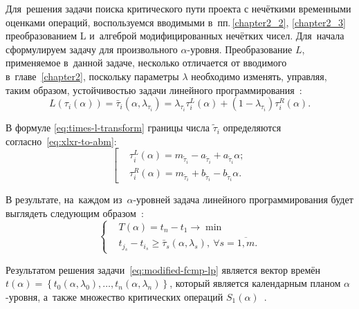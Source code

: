 Для~решения задачи поиска критического пути проекта с нечёткими временными оценками операций, воспользуемся вводимыми в~пп.\,\ref{chapter2_2}, \ref{chapter2_3} преобразованием L и~алгеброй модифицированных нечётких чисел. Для~начала сформулируем задачу для произвольного $\alpha$-уровня. Преобразование $L$, применяемое в~данной задаче, несколько отличается от вводимого в~главе~\ref{chapter2}, поскольку параметры $\lambda$ необходимо изменять, управляя, таким образом, устойчивостью задачи линейного программирования~\cite{Vorontsov_VSTU}:
\begin{equation}
\label{eq:times-l-transform}
  L(\tau_i(\alpha ))=\bar{\tau}_i\left(\alpha, \lambda_{\tau_i}\right)=\lambda_{\tau_i}\tau_{i}^{L}\left(\alpha \right)+(1-\lambda_{\tau_i})\tau_{i}^{R}\left(\alpha \right).
\end{equation}

В формуле \eqref{eq:times-l-transform} границы числа $\tilde \tau_i$ определяются согласно~\eqref{eq:xlxr-to-abm}:
\begin{equation*}
  \left[ \begin{aligned}
    & \tau_{i}^{L}\left(\alpha \right)=m_{\tilde \tau_i}-a_{\tilde \tau_i}+a_{\tilde \tau_i}\alpha; \\ 
    & \tau_{i}^{R}\left(\alpha \right)={{m}_{{{{\tilde{\tau }}}_{i}}}}+{{b}_{{{{\tilde{\tau }}}_{i}}}}-{{b}_{{{{\tilde{\tau }}}_{i}}}}\alpha.
  \end{aligned} \right.
\end{equation*}

В результате, на~каждом из~$\alpha$-уровней задача линейного программирования будет выглядеть следующим образом~\cite{Alushta-2, Vorontsov_VSTU}:
\begin{equation}
\label{eq:modified-fcpm-lp}
  \left\{ \begin{aligned}
    & T(\alpha )=t_n-t_1\to \min  \\ 
    & t_{j_s}-t_{i_s}\geqslant \bar{\tau}_s\left(\alpha,\lambda_s \right),\ \forall s=\overline{1,m}.
  \end{aligned} \right.
\end{equation}

Результатом решения задачи~\eqref{eq:modified-fcmp-lp} является вектор времён $t\left( \alpha \right)=\left\{ t_0\left(\alpha, \lambda_0\right),\ldots,t_n\left(\alpha, \lambda_n\right) \right\}$, который является календарным планом $\alpha$-уровня, а~также множество критических операций $S_1\left( \alpha \right)$~\cite{VSU-2, Alushta-2}.

